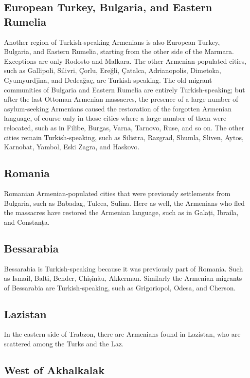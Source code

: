 \subsection{European Turkey, Bulgaria, and Eastern Rumelia}
Another region of Turkish-speaking Armenians is also European Turkey, Bulgaria, and Eastern Rumelia, starting from the other side of the Marmara. Exceptions are only Rodosto and Malkara. The other Armenian-populated cities, such as Gallipoli, Silivri, Çorlu, Ereğli, Çatalca, Adrianopolis, Dimetoka, Gyumyurdjina, and Dedeağaç, are Turkish-speaking. The old migrant communities of Bulgaria and Eastern Rumelia are entirely Turkish-speaking; but after the last Ottoman-Armenian massacres, the presence of a large number of asylum-seeking Armenians caused the restoration of the forgotten Armenian language, of course only in those cities where a large number of them were relocated, such as in Filibe, Burgas, Varna, Tarnovo, Ruse, and so on. The other cities remain Turkish-speaking, such as Silistra, Razgrad, Shumla, Sliven, Aytos, Karnobat, Yambol, Eski Zagra, and Haskovo. 
\subsection{Romania}
Romanian Armenian-populated cities that were previously settlements from Bulgaria, such as Babadag, Tulcea, Sulina. Here as well, the Armenians who fled the massacres have restored the Armenian language, such as in Galați, Ibraila, and Constanța. 

\subsection{Bessarabia}

Bessarabia is Turkish-speaking because it was previously part of Romania. Such as Ismail, Balti, Bender, Chișinău, Akkerman. Similarly the Armenian migrants of Bessarabia are Turkish-speaking, such as Grigoriopol, Odesa, and Cherson.

\subsection{Lazistan}
In the eastern side of Trabzon, there are Armenians found in Lazistan, who are scattered among the Turks and the Laz.

\subsection{West of Akhalkalak}

